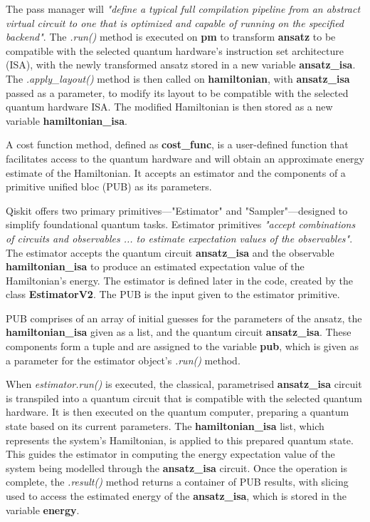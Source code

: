\documentclass{article}
\begin{document}
{The pass manager will \textit{"define a typical full compilation pipeline from an abstract virtual circuit to one that is optimized and capable of running on the specified backend"}\cite{StagedPassManager}. The \textit{.run()} method is executed on \textbf{pm} to transform \textbf{ansatz} to be compatible with the selected quantum hardware's instruction set architecture (ISA)\cite{ISACirc}, with the newly transformed ansatz stored in a new variable \textbf{ansatz\_isa}. The \textit{.apply\_layout()} method is then called on \textbf{hamiltonian}, with \textbf{ansatz\_isa} passed as a parameter, to modify its layout to be compatible with the selected quantum hardware ISA. The modified Hamiltonian is then stored as a new variable  \textbf{hamiltonian\_isa}.

A cost function method, defined as \textbf{cost\_func}, is a user-defined function that facilitates access to the quantum hardware and will obtain an approximate energy estimate of the Hamiltonian. It accepts an estimator and the components of a primitive unified bloc (PUB) as its parameters. 

 Qiskit offers two primary primitives—"Estimator" and "Sampler"—designed to simplify foundational quantum tasks\cite{QiskitRuntime}. Estimator primitives \textit{"accept combinations of circuits and observables ... to estimate expectation values of the observables"}\cite{Primitives}. The estimator accepts the quantum circuit \textbf{ansatz\_isa} and the observable \textbf{hamiltonian\_isa} to produce an estimated expectation value of the Hamiltonian's energy. The estimator is defined later in the code, created by the class \textbf{EstimatorV2}. The PUB is the input given to the estimator primitive.

PUB comprises of an array of initial guesses for the parameters of the ansatz, the \textbf{hamiltonian\_isa} given as a list, and the quantum circuit \textbf{ansatz\_isa}. These components form a tuple and are assigned to the variable \textbf{pub}, which is given as a parameter for the estimator object's \textit{.run()} method. 

When \textit{estimator.run()} is executed, the classical, parametrised \textbf{ansatz\_isa} circuit is transpiled into a quantum circuit that is compatible with the selected quantum hardware. It is then executed on the quantum computer, preparing a quantum state based on its current parameters\cite{EstimatorV2}\cite{Tutorial}. The \textbf{hamiltonian\_isa} list, which represents the system's Hamiltonian, is applied to this prepared quantum state. This guides the estimator in computing the energy expectation value of the system being modelled through the \textbf{ansatz\_isa} circuit. Once the operation is complete, the \textit{.result()} method returns a container of PUB results\cite{PrimitiveResult}, with slicing used to access the estimated energy of the \textbf{ansatz\_isa}, which is stored in the variable \textbf{energy}.

}
\end{document}
